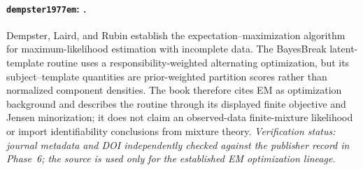 \paragraph{\texttt{dempster1977em}: \citet{dempster1977em}.}
Dempster, Laird, and Rubin establish the expectation--maximization algorithm for maximum-likelihood estimation with incomplete data. The BayesBreak latent-template routine uses a responsibility-weighted alternating optimization, but its subject--template quantities are prior-weighted partition scores rather than normalized component densities. The book therefore cites EM as optimization background and describes the routine through its displayed finite objective and Jensen minorization; it does not claim an observed-data finite-mixture likelihood or import identifiability conclusions from mixture theory. \textit{Verification status: journal metadata and DOI independently checked against the publisher record in Phase~6; the source is used only for the established EM optimization lineage.}
